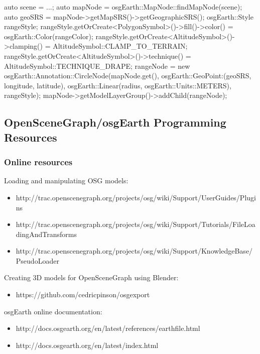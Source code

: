\begin{cpp}
auto scene = ...;
auto mapNode = osgEarth::MapNode::findMapNode(scene);
auto geoSRS = mapNode->getMapSRS()->getGeographicSRS();
osgEarth::Style rangeStyle;
rangeStyle.getOrCreate<PolygonSymbol>()->fill()->color() =
                                        osgEarth::Color(rangeColor);
rangeStyle.getOrCreate<AltitudeSymbol>()->clamping() =
                                        AltitudeSymbol::CLAMP_TO_TERRAIN;
rangeStyle.getOrCreate<AltitudeSymbol>()->technique() =
                                        AltitudeSymbol::TECHNIQUE_DRAPE;
rangeNode = new osgEarth::Annotation::CircleNode(mapNode.get(),
    osgEarth::GeoPoint:(geoSRS, longitude, latitude),
    osgEarth::Linear(radius, osgEarth::Units::METERS), rangeStyle);
mapNode->getModelLayerGroup()->addChild(rangeNode);
\end{cpp}


\subsection{OpenSceneGraph/osgEarth Programming Resources}
\label{sec:graphics:osg-osgearth-programming-resources}

\subsubsection{Online resources}
\label{sec:graphics:osg-osgearth-online-resources}

Loading and manipulating OSG models:
\begin{itemize}
\item http://trac.openscenegraph.org/projects/osg/wiki/Support/UserGuides/Plugins
\item http://trac.openscenegraph.org/projects/osg/wiki/Support/Tutorials/FileLoadingAndTransforms
\item http://trac.openscenegraph.org/projects/osg/wiki/Support/KnowledgeBase/PseudoLoader
\end{itemize}

Creating 3D models for OpenSceneGraph using Blender:
\begin{itemize}
\item https://github.com/cedricpinson/osgexport
\end{itemize}

osgEarth online documentation:
\begin{itemize}
\item http://docs.osgearth.org/en/latest/references/earthfile.html
\item http://docs.osgearth.org/en/latest/index.html
\end{itemize}

